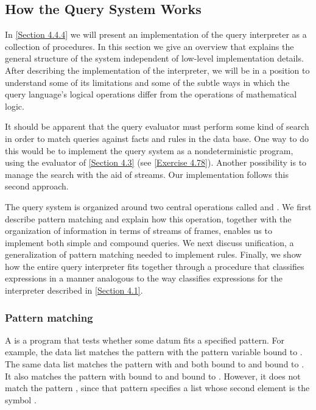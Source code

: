 \subsection{How the Query System Works}
\label{Section 4.4.2}

In \cref{Section 4.4.4} we will present an implementation of the query interpreter as a collection of procedures.
In this section we give an overview that explains the general structure of the system independent of low-level implementation details.
After describing the implementation of the interpreter, we will be in a position to understand some of its limitations and some of the subtle ways in which the query language’s logical operations differ from the operations of mathematical logic.

It should be apparent that the query evaluator must perform some kind of search in order to match queries against facts and rules in the data base.
One way to do this would be to implement the query system as a nondeterministic program, using the  evaluator of \cref{Section 4.3} (see \cref{Exercise 4.78}).
Another possibility is to manage the search with the aid of streams.
Our implementation follows this second approach.

The query system is organized around two central operations called  and .
We first describe pattern matching and explain how this operation, together with the organization of information in terms of streams of frames, enables us to implement both simple and compound queries.
We next discuss unification, a generalization of pattern matching needed to implement rules.
Finally, we show how the entire query interpreter fits together through a procedure that classifies expressions in a manner analogous to the way  classifies expressions for the interpreter described in \cref{Section 4.1}.



\subsubsection*{Pattern matching}

A  is a program that tests whether some datum fits a specified pattern.
For example, the data list  matches the pattern  with the pattern variable  bound to .
The same data list matches the pattern  with  and  both bound to  and  bound to .
It also matches the pattern  with  bound to  and  bound to .
However, it does not match the pattern , since that pattern specifies a list whose second element is the symbol .

